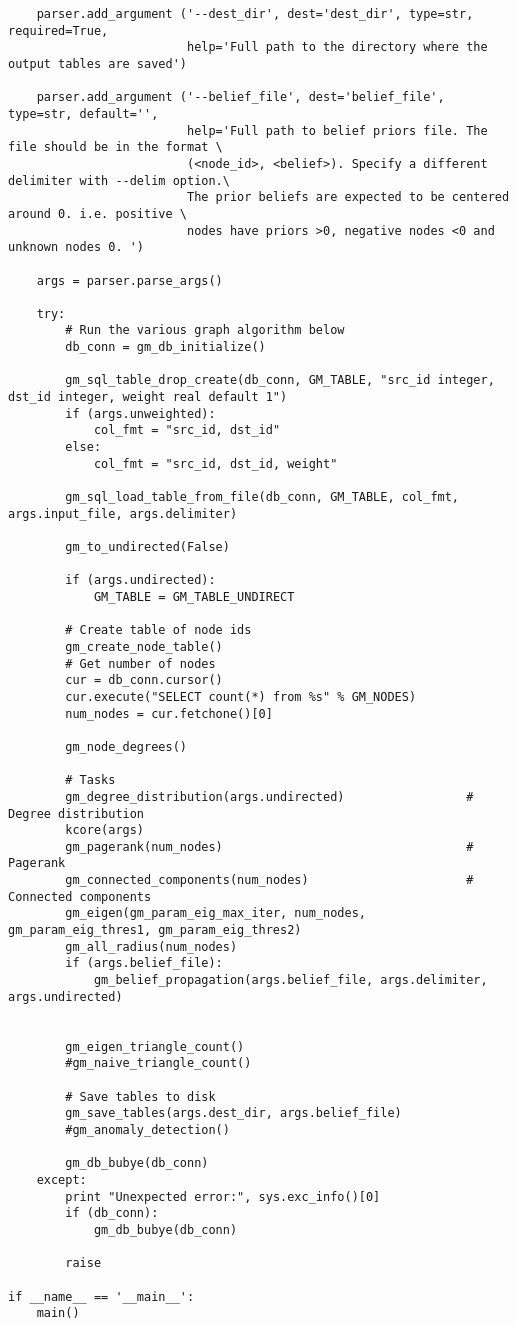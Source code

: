 \begin{lstlisting}
    parser.add_argument ('--dest_dir', dest='dest_dir', type=str, required=True,
                         help='Full path to the directory where the output tables are saved')

    parser.add_argument ('--belief_file', dest='belief_file', type=str, default='',
                         help='Full path to belief priors file. The file should be in the format \
                         (<node_id>, <belief>). Specify a different delimiter with --delim option.\
                         The prior beliefs are expected to be centered around 0. i.e. positive \
                         nodes have priors >0, negative nodes <0 and unknown nodes 0. ')

    args = parser.parse_args()

    try:
        # Run the various graph algorithm below
        db_conn = gm_db_initialize()

        gm_sql_table_drop_create(db_conn, GM_TABLE, "src_id integer, dst_id integer, weight real default 1")
        if (args.unweighted):
            col_fmt = "src_id, dst_id"
        else:
            col_fmt = "src_id, dst_id, weight"

        gm_sql_load_table_from_file(db_conn, GM_TABLE, col_fmt, args.input_file, args.delimiter)

        gm_to_undirected(False)

        if (args.undirected):
            GM_TABLE = GM_TABLE_UNDIRECT

        # Create table of node ids
        gm_create_node_table()
        # Get number of nodes
        cur = db_conn.cursor()
        cur.execute("SELECT count(*) from %s" % GM_NODES)
        num_nodes = cur.fetchone()[0]

        gm_node_degrees()

        # Tasks
        gm_degree_distribution(args.undirected)                 # Degree distribution
        kcore(args)
        gm_pagerank(num_nodes)                                  # Pagerank
        gm_connected_components(num_nodes)                      # Connected components
        gm_eigen(gm_param_eig_max_iter, num_nodes, gm_param_eig_thres1, gm_param_eig_thres2)
        gm_all_radius(num_nodes)
        if (args.belief_file):
            gm_belief_propagation(args.belief_file, args.delimiter, args.undirected)


        gm_eigen_triangle_count()
        #gm_naive_triangle_count()

        # Save tables to disk
        gm_save_tables(args.dest_dir, args.belief_file)
        #gm_anomaly_detection()

        gm_db_bubye(db_conn)
    except:
        print "Unexpected error:", sys.exc_info()[0]
        if (db_conn):
            gm_db_bubye(db_conn)

        raise

if __name__ == '__main__':
    main()


\end{lstlisting}